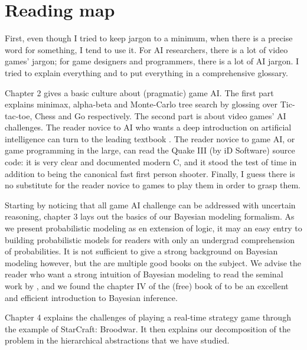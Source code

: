 

\section{Reading map}
First, even though I tried to keep jargon to a minimum, when there is a precise word for something, I tend to use it. For AI researchers, there is a lot of video games' jargon; for game designers and programmers, there is a lot of AI jargon. I tried to explain everything and to put everything in a comprehensive glossary.

Chapter 2 gives a basic culture about (pragmatic) game AI. The first part explains minimax, alpha-beta and Monte-Carlo tree search by glossing over Tic-tac-toe, Chess and Go respectively. The second part is about video games' AI challenges. The reader novice to AI who wants a deep introduction on artificial intelligence can turn to the leading textbook \citep{AIMA}. The reader novice to game AI, or game programming in the large, can read the Quake III (by iD Software) source code: it is very clear and documented modern C, and it stood the test of time in addition to being the canonical fast first person shooter. Finally, I guess there is no substitute for the reader novice to games to play them in order to grasp them.

Starting by noticing that all game AI challenge can be addressed with uncertain reasoning, chapter 3 lays out the basics of our Bayesian modeling formalism. As we present probabilistic modeling as en extension of logic, it may an easy entry to building probabilistic models for readers with only an undergrad comprehension of probabilities. It is not sufficient to give a strong background on Bayesian modeling however, but the are multiple good books on the subject. We advise the reader who want a strong intuition of Bayesian modeling to read the seminal work by \cite{Jaynes}, and we found the chapter IV of the (free) book of \cite{MacKay} to be an excellent and efficient introduction to Bayesian inference.

Chapter 4 explains the challenges of playing a real-time strategy game through the example of StarCraft: Broodwar. It then explains our decomposition of the problem in the hierarchical abstractions that we have studied.

